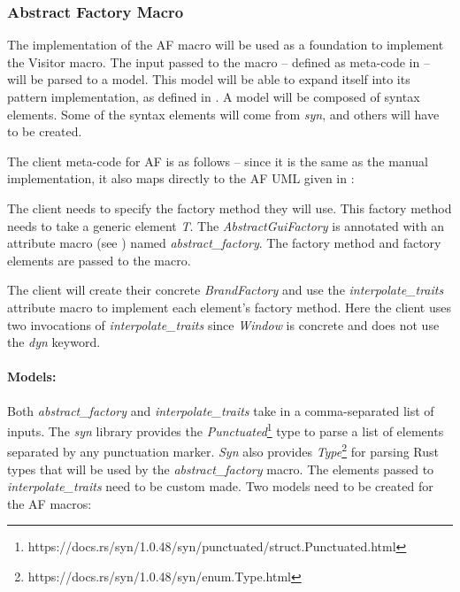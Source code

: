 \subsubsection{Abstract Factory Macro}
The implementation of the AF macro will be used as a foundation to implement the Visitor macro.
The input passed to the macro -- defined as meta-code in  -- will be parsed to a model.
This model will be able to expand itself into its pattern implementation, as defined in .
A model will be composed of syntax elements.
Some of the syntax elements will come from \textit{syn}, and others will have to be created.

The client meta-code for AF is as follows -- since it is the same as the manual implementation, it also maps directly to the AF UML given in :


The client needs to specify the factory method they will use.
This factory method needs to take a generic element \textit{T}.
The \textit{AbstractGuiFactory} is annotated with an attribute macro (see ) named \textit{abstract\_factory}.
The factory method and factory elements are passed to the macro.

The client will create their concrete \textit{BrandFactory} and use the \textit{interpolate\_traits} attribute macro to implement each element's factory method.
Here the client uses two invocations of \textit{interpolate\_traits} since \textit{Window} is concrete and does not use the \textit{dyn} keyword.

\paragraph{Models:}
Both \textit{abstract\_factory} and \textit{interpolate\_traits} take in a comma-separated list of inputs.
The \textit{syn} library provides the \textit{Punctuated}\footnote{https://docs.rs/syn/1.0.48/syn/punctuated/struct.Punctuated.html} type to parse a list of elements separated by any punctuation marker.
\textit{Syn} also provides \textit{Type}\footnote{https://docs.rs/syn/1.0.48/syn/enum.Type.html} for parsing Rust types that will be used by the \textit{abstract\_factory} macro.
The elements passed to \textit{interpolate\_traits} need to be custom made.
Two models need to be created for the AF macros:

